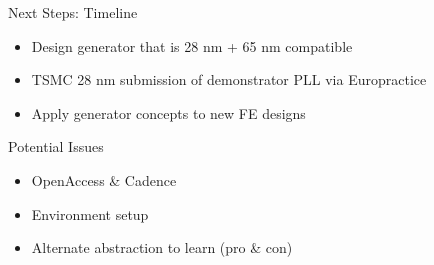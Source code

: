 \begin{frame}{Next Steps: Timeline}
\protect\hypertarget{next-steps-timeline}{}
\begin{itemize}
\tightlist
\item
  Design generator that is 28 nm + 65 nm compatible
\item
  TSMC 28 nm submission of demonstrator PLL via Europractice
\item
  Apply generator concepts to new FE designs
\end{itemize}

\begin{block}{Potential Issues}
\protect\hypertarget{potential-issues}{}
\begin{itemize}
\tightlist
\item
  OpenAccess \& Cadence
\item
  Environment setup
\item
  Alternate abstraction to learn (pro \& con)
\end{itemize}
\end{block}
\end{frame}
